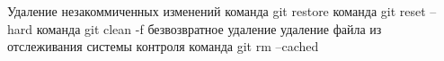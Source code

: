 Удаление незакоммиченных изменений
команда git restore
команда git reset –hard
команда git clean -f
безвозвратное удаление
удаление файла из отслеживания системы контроля
команда git rm –cached